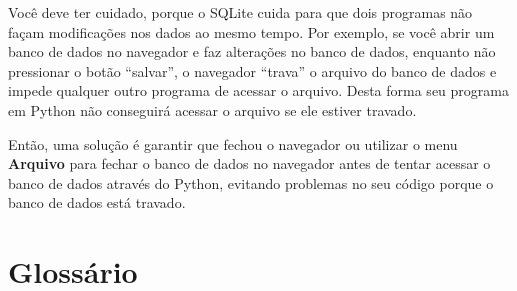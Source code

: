 Você deve ter cuidado, porque o SQLite cuida para que dois programas não
façam modificações nos dados ao mesmo tempo. Por exemplo, se você abrir
um banco de dados no navegador e faz alterações no banco de dados, enquanto
não pressionar o botão ``salvar'', o navegador ``trava'' o arquivo do banco
de dados e impede qualquer outro programa de acessar o arquivo. Desta forma
seu programa em Python não conseguirá acessar o arquivo se ele estiver travado.


Então, uma solução é garantir que fechou o navegador ou utilizar o menu
{\bf Arquivo} para fechar o banco de dados no navegador antes de tentar
acessar o banco de dados através do Python, evitando problemas no seu código
porque o banco de dados está travado.

\section{Glossário}

